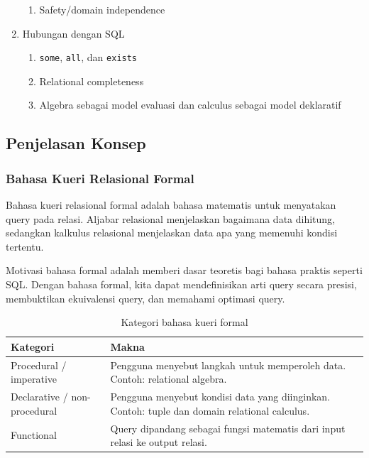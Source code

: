 \begin{enumerate}
\begin{enumerate}
        \item \pwajib Safety/domain independence
    \end{enumerate}
    \item \pwajib Hubungan dengan SQL
    \begin{enumerate}
        \item \pwajib \texttt{some}, \texttt{all}, dan \texttt{exists}
        \item \pwajib Relational completeness
        \item \pwajib Algebra sebagai model evaluasi dan calculus sebagai model deklaratif
    \end{enumerate}
\end{enumerate}

\subsection{Penjelasan Konsep}

\subsubsection{Bahasa Kueri Relasional Formal}

\begin{jawab}
Bahasa kueri relasional formal adalah bahasa matematis untuk menyatakan query pada relasi. Aljabar relasional menjelaskan bagaimana data dihitung, sedangkan kalkulus relasional menjelaskan data apa yang memenuhi kondisi tertentu.
\end{jawab}

Motivasi bahasa formal adalah memberi dasar teoretis bagi bahasa praktis seperti SQL. Dengan bahasa formal, kita dapat mendefinisikan arti query secara presisi, membuktikan ekuivalensi query, dan memahami optimasi query.

\begin{table}[H]
\centering
\begin{tabularx}{\textwidth}{|L{0.28\textwidth}|X|}
\hline
\textbf{Kategori} & \textbf{Makna} \\
\hline
Procedural / imperative & Pengguna menyebut langkah untuk memperoleh data. Contoh: relational algebra. \\
\hline
Declarative / non-procedural & Pengguna menyebut kondisi data yang diinginkan. Contoh: tuple dan domain relational calculus. \\
\hline
Functional & Query dipandang sebagai fungsi matematis dari input relasi ke output relasi. \\
\hline
\end{tabularx}
\caption{Kategori bahasa kueri formal}
\label{tab:formal-query-language}
\end{table}


